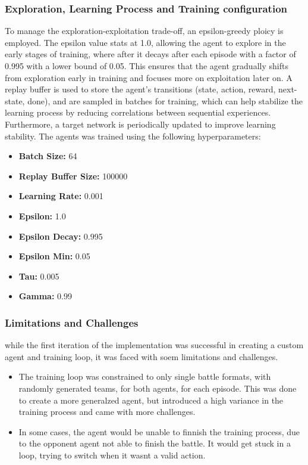 \subsubsection{Exploration, Learning Process and Training configuration}
To manage the exploration-exploitation trade-off, an epsilon-greedy ploicy is employed.
The epsilon value stats at 1.0, allowing the agent to explore in the early stages of training,
where after it decays after each episode with a factor of 0.995 with a lower bound of 0.05.
This ensures that the agent gradually shifts from exploration early in training
and focuses more on exploitation later on.
A replay buffer is used to store the agent's transitions (state, action, reward, next-state, done), 
and are sampled in batches for training, which can help stabilize the learning process 
by reducing correlations between sequential experiences. Furthermore, a target 
network is periodically updated to improve learning stability.
The agents was trained using the following hyperparameters:
\begin{itemize}
    \item \textbf{Batch Size:} 64
    \item \textbf{Replay Buffer Size:} 100000
    \item \textbf{Learning Rate:} 0.001 
    \item \textbf{Epsilon:} 1.0
    \item \textbf{Epsilon Decay:} 0.995
    \item \textbf{Epsilon Min:} 0.05
    \item \textbf{Tau:} 0.005
    \item \textbf{Gamma:} 0.99
\end{itemize}

\subsubsection{Limitations and Challenges}
while the first iteration of the implementation was successful in creating a custom agent
and training loop, it was faced with soem limitations and challenges.
\begin{itemize}
    \item The training loop was constrained to only single battle formats, with
    randomly generated teams, for both agents, for each episode. This was done to create a
    more generalzed agent, but introduced a high variance in the training process and came with more challenges.
    \item In some cases, the agent would be unable to finnish the training process, due to the 
    opponent agent not able to finish the battle. It would get stuck in a loop, trying to switch when it
    wasnt a valid action.
\end{itemize}